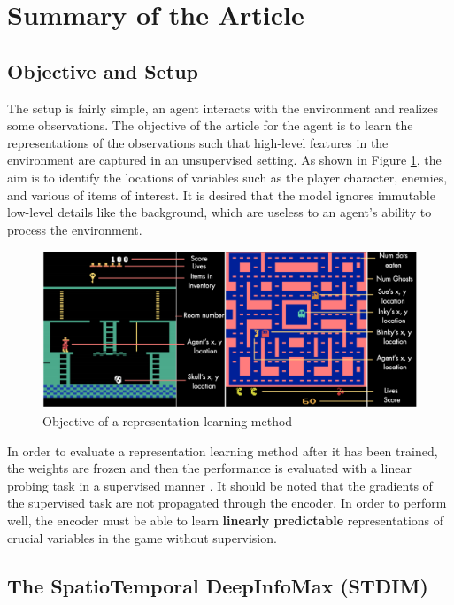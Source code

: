 \section{Summary of the Article}
\label{section:summary}

\subsection{Objective and Setup}
The setup is fairly simple, an agent interacts with the environment and realizes some observations. The objective of the article for the agent is to learn the representations of the observations such that high-level features in the environment are captured in an unsupervised setting. As shown in Figure \ref{fig:objective}, the aim is to identify the locations of variables such as the player character, enemies, and various of items of interest. It is desired that the model ignores immutable low-level details like the background, which are useless to an agent's ability to process the environment.

\begin{figure}[H]
    \centering
    \includegraphics[scale=0.32]{../openreview/objective.PNG}
    \caption{Objective of a representation learning method}
    \label{fig:objective}
\end{figure}

In order to evaluate a representation learning method after it has been trained, the weights are frozen and then the performance is evaluated with a linear probing task in a supervised manner \cite{linear_probing}. It should be noted that the gradients of the supervised task are not propagated through the encoder. In order to perform well, the encoder must be able to learn \textbf{linearly predictable} representations of crucial variables in the game without supervision.

\subsection{The SpatioTemporal DeepInfoMax (STDIM)}
\label{section:stdim}

